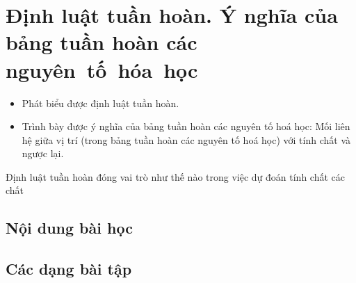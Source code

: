 \section[Định luật tuần hoàn]{Định luật tuần hoàn. Ý nghĩa của bảng tuần hoàn các nguyên~tố~hóa~học}
\vspace{1.25cm}
\begin{Muctieu}
	\begin{itemize}
		\item  Phát biểu được định luật tuần hoàn.
		\item  Trình bày được ý nghĩa của bảng tuần hoàn các nguyên tố hoá học: Mối liên hệ giữa vị trí (trong bảng tuần hoàn các nguyên tố hoá học) với tính chất và ngược lại.
	\end{itemize}
\end{Muctieu}
\begin{kd}
	Định luật tuần hoàn đóng vai trò như thế nào trong việc dự đoán tính chất các chất
\end{kd}
\subsection{Nội dung bài học}

\subsection{Các dạng bài tập}
